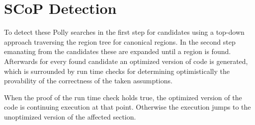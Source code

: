 \section{SCoP Detection}
To detect these \scops Polly searches in the first step for candidates using a top-down approach traversing the region tree for canonical regions.
In the second step emanating from the candidates these are expanded until a  region is found.
Afterwards  for every found candidate an optimized version of code is generated, which is surrounded by run time checks for determining optimistically the provability of the correctness of the taken assumptions.

When the proof of the run time check holds true, the optimized version of the code is continuing execution at that point.
Otherwise the execution jumps to the unoptimized version of the affected section.
